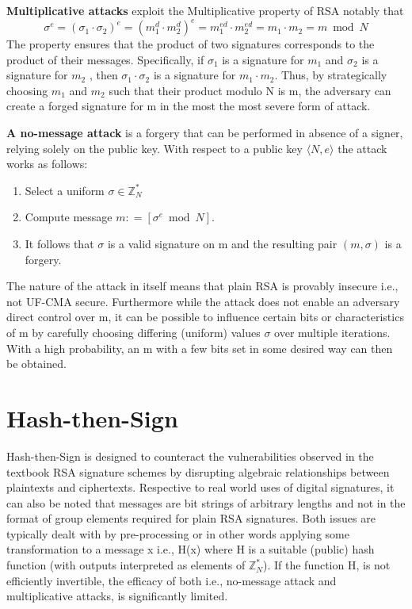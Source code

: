 \documentclass[]{final_report}
\theoremstyle{definition}
\begin{document}
\textbf{Multiplicative attacks} exploit the Multiplicative property of RSA notably that
\begin{equation}
\sigma^e = (\sigma_{1} \cdot \sigma_{2})^e = (m_{1}^d \cdot m_{2}^d)^e = m_{1}^{ed} \cdot m_{2}^{ed} = m_{1} \cdot m_{2} = m \bmod N 
\end{equation}
The property ensures that the product of two signatures corresponds to the product of their messages. Specifically, if $\sigma_{1}$ is a signature for $m_{1}$ and $\sigma_{2}$ is a signature for $m_{2}$ , then $\sigma_{1} \cdot \sigma_{2}$ is a signature for $m_{1} \cdot m_{2}$. Thus, by strategically choosing $m_{1}$ and $m_{2}$ such that their product modulo N is m, the adversary can create a forged signature for m in the most the most severe form of attack.

\textbf{A no-message attack} is a forgery that can be performed in absence of a signer, relying solely on the public key. With respect to a public key $\langle N, e \rangle$ the attack works as follows:
\begin{enumerate}
    \item Select a uniform $\sigma \in \mathbb{Z}^*_{N}$
    \item Compute message $m : = [\sigma^e \bmod N]$.
    \item It follows that $\sigma$ is a valid signature on m and the resulting pair $(m, \sigma)$ is a forgery.
\end{enumerate}
The nature of the attack in itself means that plain RSA is provably insecure i.e., not UF-CMA secure. Furthermore while the attack does not enable an adversary direct control over m, it can be possible to influence certain bits or characteristics of m by carefully choosing differing (uniform) values $\sigma$ over multiple iterations. With a high probability, an m with a few bits set in some desired way can then be obtained.

\section{Hash-then-Sign}
Hash-then-Sign is designed to counteract the vulnerabilities observed in the textbook RSA signature schemes by disrupting algebraic relationships between plaintexts and ciphertexts. Respective to real world uses of digital signatures, it can also be noted that messages are bit strings of arbitrary lengths and not in the format of group elements required for plain RSA signatures.
Both issues are typically dealt with by pre-processing or in other words applying some transformation to a message x i.e., H(x) where H is a suitable (public) hash function (with outputs interpreted as elements of $\mathbb{Z}^*_{N}$). If the function H, is not efficiently invertible, the efficacy of both i.e., no-message attack and multiplicative attacks, is significantly limited.
\end{document}
